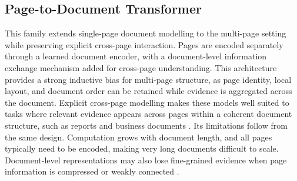 \documentclass[11pt]{article}
\begin{document}

\subsection{Page-to-Document Transformer}
This family extends single-page document modelling to the multi-page setting while preserving explicit cross-page interaction. Pages are encoded separately through a learned document encoder, with a document-level information exchange mechanism added for cross-page understanding. This architecture provides a strong inductive bias for multi-page structure, as page identity, local layout, and document order can be retained while evidence is aggregated across the document. Explicit cross-page modelling makes these models well suited to tasks where relevant evidence appears across pages within a coherent document structure, such as reports and business documents \cite{tito2023hierarchical, borchmann2025arctic}. Its limitations follow from the same design. Computation grows with document length, and all pages typically need to be encoded, making very long documents difficult to scale. Document-level representations may also lose fine-grained evidence when page information is compressed or weakly connected \cite{blau2024gram, dong2024multi}. 

\end{document}
